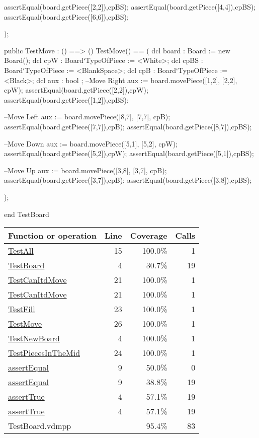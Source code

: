 \begin{vdmpp}[breaklines=true]
  assertEqual(board.getPiece([2,2]),cpBS);
  assertEqual(board.getPiece([4,4]),cpBS);
  assertEqual(board.getPiece([6,6]),cpBS);
  
 );


 public TestMove : () ==> ()
 TestMove() == 
 (
  dcl board : Board := new Board();
  dcl cpW : Board`TypeOfPiece := <White>;
  dcl cpBS : Board`TypeOfPiece := <BlankSpace>;
  dcl cpB : Board`TypeOfPiece := <Black>;
  dcl aux : bool ;
  --Move Right
  aux := board.movePiece([1,2], [2,2], cpW);
  assertEqual(board.getPiece([2,2]),cpW);
  assertEqual(board.getPiece([1,2]),cpBS);
  
  --Move Left
  aux := board.movePiece([8,7], [7,7], cpB);
  assertEqual(board.getPiece([7,7]),cpB);
  assertEqual(board.getPiece([8,7]),cpBS);
  
  --Move Down
  aux := board.movePiece([5,1], [5,2], cpW);
  assertEqual(board.getPiece([5,2]),cpW);
  assertEqual(board.getPiece([5,1]),cpBS);
  
  --Move Up
  aux := board.movePiece([3,8], [3,7], cpB);
  assertEqual(board.getPiece([3,7]),cpB);
  assertEqual(board.getPiece([3,8]),cpBS); 
  
  
  
  
  
 );


end TestBoard
\end{vdmpp}
\bigskip
\begin{longtable}{|l|r|r|r|}
\hline
Function or operation & Line & Coverage & Calls \\
\hline
\hline
\hyperref[TestAll:15]{TestAll} & 15&100.0\% & 1 \\
\hline
\hyperref[TestBoard:4]{TestBoard} & 4&30.7\% & 19 \\
\hline
\hyperref[TestCanItdMove:21]{TestCanItdMove} & 21&100.0\% & 1 \\
\hline
\hyperref[TestCanItdMove:21]{TestCanItdMove} & 21&100.0\% & 1 \\
\hline
\hyperref[TestFill:23]{TestFill} & 23&100.0\% & 1 \\
\hline
\hyperref[TestMove:26]{TestMove} & 26&100.0\% & 1 \\
\hline
\hyperref[TestNewBoard:4]{TestNewBoard} & 4&100.0\% & 1 \\
\hline
\hyperref[TestPiecesInTheMid:24]{TestPiecesInTheMid} & 24&100.0\% & 1 \\
\hline
\hyperref[assertEqual:9]{assertEqual} & 9&50.0\% & 0 \\
\hline
\hyperref[assertEqual:9]{assertEqual} & 9&38.8\% & 19 \\
\hline
\hyperref[assertTrue:4]{assertTrue} & 4&57.1\% & 19 \\
\hline
\hyperref[assertTrue:4]{assertTrue} & 4&57.1\% & 19 \\
\hline
\hline
TestBoard.vdmpp & & 95.4\% & 83 \\
\hline
\end{longtable}

